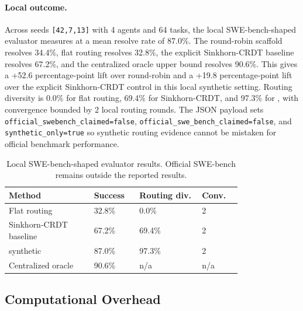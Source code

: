 \paragraph{Local outcome.}
Across seeds \texttt{[42,7,13]} with 4 agents and 64 tasks, the local
SWE-bench-shaped evaluator measures \fedsink{} at a mean resolve rate of 87.0\%.
The round-robin scaffold resolves 34.4\%, flat routing resolves 32.8\%, the explicit
Sinkhorn-CRDT baseline resolves 67.2\%, and the centralized oracle upper bound resolves
90.6\%.  This gives \fedsink{} a +52.6 percentage-point lift over round-robin and a
+19.8 percentage-point lift over the explicit Sinkhorn-CRDT control in this local
synthetic setting.  Routing diversity is 0.0\% for flat routing, 69.4\% for
Sinkhorn-CRDT, and 97.3\% for \fedsink{}, with convergence bounded by 2 local routing
rounds.  The JSON payload sets \texttt{official\_swebench\_claimed=false},
\texttt{official\_swe\_bench\_claimed=false}, and \texttt{synthetic\_only=true} so
synthetic routing evidence cannot be mistaken for official benchmark performance.

\begin{table}[b]
  \centering
  \footnotesize
  \caption{Local SWE-bench-shaped evaluator results. Official SWE-bench remains
    outside the reported results.}
  \label{tab:sweb_results}
  \begin{tabular}{p{0.30\linewidth}p{0.13\linewidth}p{0.22\linewidth}p{0.14\linewidth}}
    \toprule
    Method & Success & Routing div. & Conv. \\
    \midrule
    Flat routing           & 32.8\% & 0.0\% & 2 \\
    Sinkhorn-CRDT baseline & 67.2\% & 69.4\% & 2 \\
    \fedsink{} synthetic   & 87.0\% & 97.3\% & 2 \\
    Centralized oracle     & 90.6\% & n/a & n/a \\
    \bottomrule
  \end{tabular}
\end{table}

\subsection{Computational Overhead}

